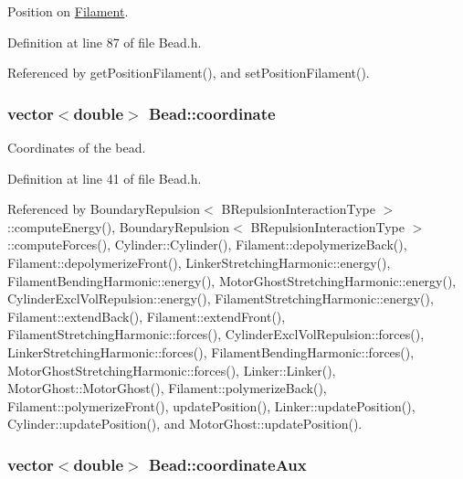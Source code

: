 Position on \hyperlink{classFilament}{Filament}. 



Definition at line 87 of file Bead.\+h.



Referenced by get\+Position\+Filament(), and set\+Position\+Filament().

\hypertarget{classBead_a8c9c7d97a682694bf3b16a0922b23786}{
\subsubsection[{coordinate}]{\setlength{\rightskip}{0pt plus 5cm}vector$<$double$>$ Bead\+::coordinate}}\label{classBead_a8c9c7d97a682694bf3b16a0922b23786}


Coordinates of the bead. 



Definition at line 41 of file Bead.\+h.



Referenced by Boundary\+Repulsion$<$ B\+Repulsion\+Interaction\+Type $>$\+::compute\+Energy(), Boundary\+Repulsion$<$ B\+Repulsion\+Interaction\+Type $>$\+::compute\+Forces(), Cylinder\+::\+Cylinder(), Filament\+::depolymerize\+Back(), Filament\+::depolymerize\+Front(), Linker\+Stretching\+Harmonic\+::energy(), Filament\+Bending\+Harmonic\+::energy(), Motor\+Ghost\+Stretching\+Harmonic\+::energy(), Cylinder\+Excl\+Vol\+Repulsion\+::energy(), Filament\+Stretching\+Harmonic\+::energy(), Filament\+::extend\+Back(), Filament\+::extend\+Front(), Filament\+Stretching\+Harmonic\+::forces(), Cylinder\+Excl\+Vol\+Repulsion\+::forces(), Linker\+Stretching\+Harmonic\+::forces(), Filament\+Bending\+Harmonic\+::forces(), Motor\+Ghost\+Stretching\+Harmonic\+::forces(), Linker\+::\+Linker(), Motor\+Ghost\+::\+Motor\+Ghost(), Filament\+::polymerize\+Back(), Filament\+::polymerize\+Front(), update\+Position(), Linker\+::update\+Position(), Cylinder\+::update\+Position(), and Motor\+Ghost\+::update\+Position().

\hypertarget{classBead_a4d46596f52ee0ce95e3e717483e1a921}{
\subsubsection[{coordinate\+Aux}]{\setlength{\rightskip}{0pt plus 5cm}vector$<$double$>$ Bead\+::coordinate\+Aux}}\label{classBead_a4d46596f52ee0ce95e3e717483e1a921}


